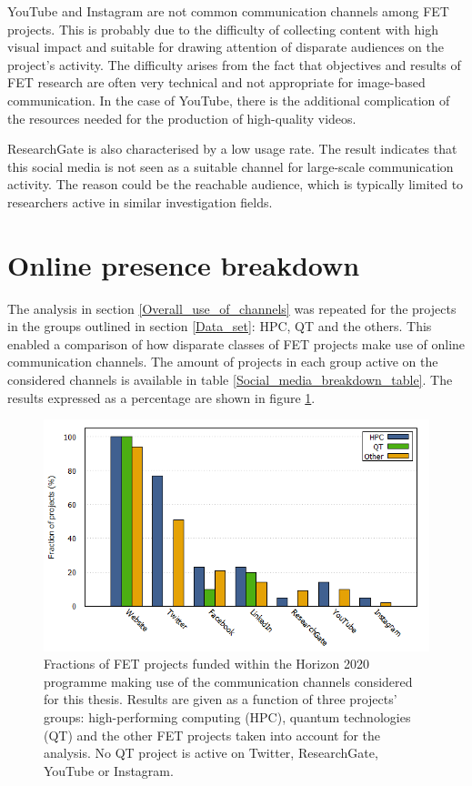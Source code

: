 YouTube and Instagram are not common communication channels among FET projects. This is probably due to the difficulty of collecting content with high visual impact and suitable for drawing attention of disparate audiences on the project's activity. The difficulty arises from the fact that objectives and results of FET research are often very technical and not appropriate for image-based communication. In the case of YouTube, there is the additional complication of the resources needed for the production of high-quality videos.

ResearchGate is also characterised by a low usage rate. The result indicates that this social media is not seen as a suitable channel for large-scale communication activity. The reason could be the reachable audience, which is typically limited to researchers active in similar investigation fields.

\section{Online presence breakdown} \label{Online_presence_breakdown}
The analysis in section \ref{Overall_use_of_channels} was repeated for the projects in the groups outlined in section \ref{Data_set}: HPC, QT and the others. This enabled a comparison of how disparate classes of FET projects make use of online communication channels. The amount of projects in each group active on the considered channels is available in table \ref{Social_media_breakdown_table}. The results expressed as a percentage are shown in figure \ref{Social_media_breakdown}. 

\begin{figure}[!t] 
 \begin{center}
 \includegraphics[scale=0.45]{Images/Social_media_breakdown.png}
 \caption{Fractions of FET projects funded within the Horizon 2020 programme making use of the communication channels considered for this thesis. Results are given as a function of three projects' groups: high-performing computing (HPC), quantum technologies (QT) and the other FET projects taken into account for the analysis. No QT project is active on Twitter, ResearchGate, YouTube or Instagram.}
 \label{Social_media_breakdown}
 \end{center}
\end{figure}

